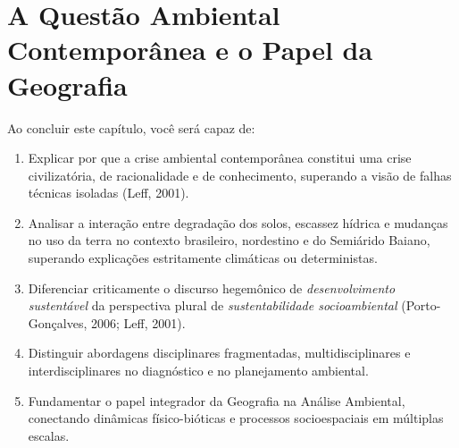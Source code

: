 \chapter{A Questão Ambiental Contemporânea e o Papel da Geografia}
\noindent\tagEmenta\par\vspace{6pt}

\begin{capObjetivos}
Ao concluir este capítulo, você será capaz de:
\begin{enumerate}[leftmargin=1.6em, itemsep=2.5pt]
  \item Explicar por que a crise ambiental contemporânea constitui uma crise civilizatória, de racionalidade e de conhecimento, superando a visão de falhas técnicas isoladas (Leff, 2001).
  \item Analisar a interação entre degradação dos solos, escassez hídrica e mudanças no uso da terra no contexto brasileiro, nordestino e do Semiárido Baiano, superando explicações estritamente climáticas ou deterministas.
  \item Diferenciar criticamente o discurso hegemônico de \emph{desenvolvimento sustentável} da perspectiva plural de \emph{sustentabilidade socioambiental} (Porto-Gonçalves, 2006; Leff, 2001).
  \item Distinguir abordagens disciplinares fragmentadas, multidisciplinares e interdisciplinares no diagnóstico e no planejamento ambiental.
  \item Fundamentar o papel integrador da Geografia na Análise Ambiental, conectando dinâmicas físico-bióticas e processos socioespaciais em múltiplas escalas.
\end{enumerate}
\end{capObjetivos}

